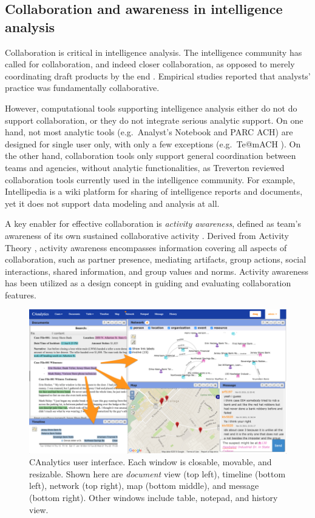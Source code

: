 \subsection{Collaboration and awareness in intelligence analysis}

Collaboration is critical in intelligence analysis. The intelligence community has called for collaboration, and indeed closer collaboration, as opposed to merely coordinating draft products by the end \cite{Vision2015}. Empirical studies \cite{Chin2009,Kang2011} reported that analysts' practice was fundamentally collaborative. 

However, computational tools supporting intelligence analysis either do not do support collaboration, or they do not integrate serious analytic support. On one hand, not most analytic tools (e.g.~Analyst's Notebook and PARC ACH) are designed for single user only, with only a few exceptions (e.g.~Te@mACH \cite{Globalytica2017}). On the other hand, collaboration tools only support general coordination between teams and agencies, without analytic functionalities, as Treverton \cite{Treverton2016} reviewed collaboration tools currently used in the intelligence community. For example, Intellipedia \cite{Intelink2017} is a wiki platform for sharing of intelligence reports and documents, yet it does not support data modeling and analysis at all. 

A key enabler for effective collaboration is \emph{activity awareness}, defined as
team's awareness of its own sustained collaborative activity
\cite{Carroll2003,Carroll2006}. Derived from Activity Theory \cite{Leontev1974},
activity awareness encompasses information covering all aspects of collaboration, such as partner presence, mediating artifacts, group actions, social interactions, shared information, and group values and norms. Activity awareness has been utilized as a design concept in guiding and evaluating collaboration features.

\begin{figure}
\centering
\includegraphics[width=2\columnwidth]{./img/interface.png}
\caption{CAnalytics user interface. Each window is closable, movable, and resizable. Shown here are \emph{document} view (top left), timeline (bottom left), network (top right), map (bottom middle), and message (bottom right). Other windows include table, notepad, and history view. }\label{fig:canalytics}
\end{figure}

